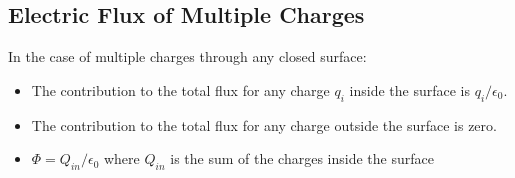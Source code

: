 \documentclass{article}
\begin{document}
\subsection*{Electric Flux of Multiple Charges}
In the case of multiple charges through any closed surface:
\begin{itemize}
    \item The contribution to the total flux for any charge $q_i$ inside the surface is $q_i/\epsilon_0$.
    \item The contribution to the total flux for any charge outside the surface is zero.
    \item $\Phi = Q_{in} / \epsilon_0$ where $Q_{in}$ is the sum of the charges inside the surface
\end{itemize}
\end{document}
